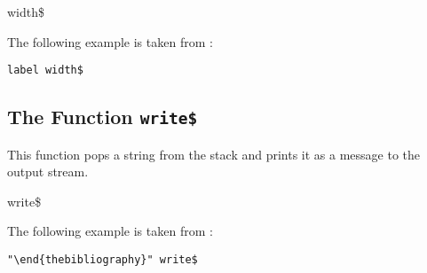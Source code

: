 \begin{BstFunction}{width\$}
\end{BstFunction}

The following example is taken from :

\begin{lstlisting}[language=bst]
  label width$
\end{lstlisting}


\subsection{The Function \texttt{write\$}}%

This function pops a string from the stack and prints it as a
message to the output stream.

\begin{BstFunction}{write\$}
\end{BstFunction}

The following example is taken from :

\begin{lstlisting}[language=bst]
  "\end{thebibliography}" write$
\end{lstlisting}

%
\endinput
%
